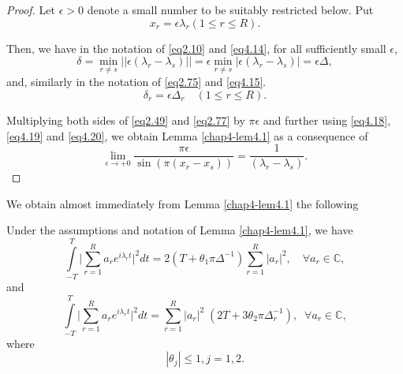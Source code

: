 \begin{proof} %
Let $\epsilon > 0$ denote a small number to be suitably restricted below. Put
\begin{equation*}
x_r = \epsilon \lambda_r  (1 \le r \le R). \tag{4.18}\label{eq4.18} 
\end{equation*}

Then, we have in the notation of \eqref{eq2.10} and \eqref{eq4.14}, for all
sufficiently small $\epsilon$, 
\begin{equation*}
\delta = \min_{r \neq s}  || \epsilon (\lambda_r - \lambda_s ) || =
\epsilon \min_{r \neq s} |\epsilon (\lambda_r - \lambda_s) | = \epsilon \Delta,
\tag{4.19}\label{eq4.19}  
\end{equation*}
and, similarly in the notation of \eqref{eq2.75} and \eqref{eq4.15}.
\begin{equation*}
\delta_r = \epsilon \Delta_r\quad (1 \leq r \leq
R). \tag{4.20}\label{eq4.20} 
\end{equation*}

Multiplying both sides of \eqref{eq2.49} and \eqref{eq2.77} by $\pi
\epsilon$ and further using \eqref{eq4.18}, \eqref{eq4.19} and
\eqref{eq4.20}, we obtain Lemma \ref{chap4-lem4.1} as 
a consequence of  
\begin{equation*}
\lim\limits_{\epsilon \to + 0}  \frac{\pi \epsilon} {\sin (\pi (x_r -
  x_s))} = \frac{1} 
    {(\lambda_r - \lambda_s )}. \tag{4.21} \label{eq4.21}
\end{equation*}
\end{proof}

We obtain almost immediately from Lemma \ref{chap4-lem4.1} the following 

\begin{theorem}\label{chap4-thm4.2} %
Under the assumptions and notation of Lemma \ref{chap4-lem4.1}, we have
\begin{equation*}
\int\limits_{-T}^T \Big|\sum_{r=1}^R a_r e^{i \lambda_rt}
\Big|^2 dt = 2 (T + \theta_1 \pi \Delta^{-1}) \sum_{r=1}^R |a_r|^2,\quad
\forall a_r \in \mathbb{C}, \tag{4.22} \label{eq4.22}
\end{equation*}\pageoriginale
and
\begin{equation*}
\int\limits_{-T}^T \Big| \sum_{r=1}^R a_r e^{i \lambda_rt}
\Big|^2 dt  = \sum_{r=1}^R |a_r|^2 \;  (2T + 3\theta_2 \pi \Delta^{-1}_r),\;\;
\forall a_r \in \mathbb{C},  \tag{4.23}\label{eq4.23} 
\end{equation*}
where
\begin{equation*}
|\theta_j| \leq 1, j=1, 2. \tag{4.24}\label{eq4.24}
\end{equation*}
\end{theorem}

